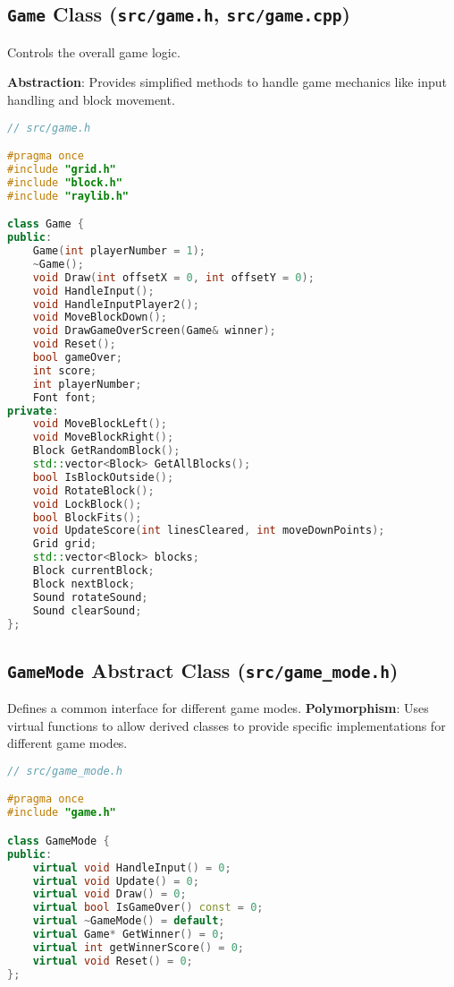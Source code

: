 \documentclass{article}
\begin{document}
\subsection{\texttt{Game} Class (\texttt{src/game.h}, \texttt{src/game.cpp})}

Controls the overall game logic.

\textbf{Abstraction}: Provides simplified methods to handle game mechanics like input handling and block movement.

\begin{lstlisting}[language=C++]
// src/game.h

#pragma once
#include "grid.h"
#include "block.h"
#include "raylib.h"

class Game {
public:
    Game(int playerNumber = 1);
    ~Game();
    void Draw(int offsetX = 0, int offsetY = 0);
    void HandleInput();
    void HandleInputPlayer2();
    void MoveBlockDown();
    void DrawGameOverScreen(Game& winner);
    void Reset();
    bool gameOver;
    int score;
    int playerNumber;
    Font font;
private:
    void MoveBlockLeft();
    void MoveBlockRight();
    Block GetRandomBlock();
    std::vector<Block> GetAllBlocks();
    bool IsBlockOutside();
    void RotateBlock();
    void LockBlock();
    bool BlockFits();
    void UpdateScore(int linesCleared, int moveDownPoints);
    Grid grid;
    std::vector<Block> blocks;
    Block currentBlock;
    Block nextBlock;
    Sound rotateSound;
    Sound clearSound;
};
\end{lstlisting}

\subsection{\texttt{GameMode} Abstract Class (\texttt{src/game\_mode.h})}
Defines a common interface for different game modes.
\textbf{Polymorphism}: Uses virtual functions to allow derived classes to provide specific implementations for different game modes.

\begin{lstlisting}[language=C++]
// src/game_mode.h

#pragma once
#include "game.h"

class GameMode {
public:
    virtual void HandleInput() = 0;
    virtual void Update() = 0;
    virtual void Draw() = 0;
    virtual bool IsGameOver() const = 0;
    virtual ~GameMode() = default;
    virtual Game* GetWinner() = 0;
    virtual int getWinnerScore() = 0;
    virtual void Reset() = 0;
};
\end{lstlisting}
\end{document}
